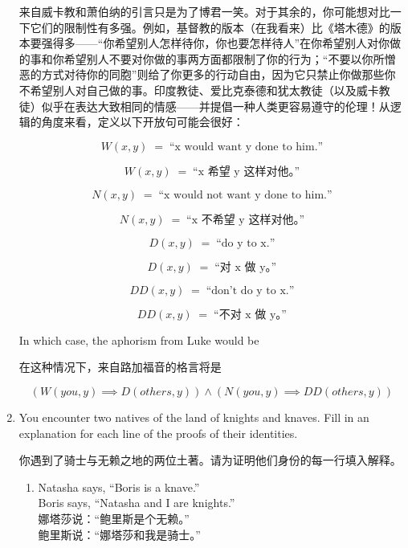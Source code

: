 \begin{enumerate}
{  来自威卡教和萧伯纳的引言只是为了博君一笑。对于其余的，你可能想对比一下它们的限制性有多强。例如，基督教的版本（在我看来）比《塔木德》的版本要强得多——“你希望别人怎样待你，你也要怎样待人”在你希望别人对你做的事和你希望别人不要对你做的事两方面都限制了你的行为；“不要以你所憎恶的方式对待你的同胞”则给了你更多的行动自由，因为它只禁止你做那些你不希望别人对自己做的事。印度教徒、爱比克泰德和犹太教徒（以及威卡教徒）似乎在表达大致相同的情感——并提倡一种人类更容易遵守的伦理！从逻辑的角度来看，定义以下开放句可能会很好：
  
  \[ W(x,y) \; = \; \mbox{``x would want y done to him.''} \]
  
  \[ W(x,y) \; = \; \mbox{“x 希望 y 这样对他。”} \]
  
  \[ N(x,y)  \; = \; \mbox{``x would not want y done to him.''} \]
  
  \[ N(x,y)  \; = \; \mbox{“x 不希望 y 这样对他。”} \]
  
  \[ D(x,y)  \; = \; \mbox{``do y to x.''} \]
  
  \[ D(x,y)  \; = \; \mbox{“对 x 做 y。”} \]
  
  \[ DD(x,y)  \; = \; \mbox{``don't do y to x.''} \]
  
  \[ DD(x,y)  \; = \; \mbox{“不对 x 做 y。”} \]
  
  In which case, the aphorism from Luke would be
  
  在这种情况下，来自路加福音的格言将是
  
  \[ (W(you, y) \implies  D(others, y)) \land (N(you, y) \implies DD(others, y)) \]
  
  }
  
  \workbookpagebreak
  \textbookpagebreak
  
  \item You encounter two natives of the land of knights and knaves.
  Fill
  in an explanation for each line of the proofs of their identities.
  
  你遇到了骑士与无赖之地的两位土著。请为证明他们身份的每一行填入解释。
  \begin{enumerate}
  \item Natasha says, ``Boris is a knave.'' \\
  Boris says, ``Natasha and I are knights.''\\
  
  娜塔莎说：“鲍里斯是个无赖。”\\
  鲍里斯说：“娜塔莎和我是骑士。”\\
  
  \hintspagebreak
  

\end{enumerate}
\end{enumerate}
